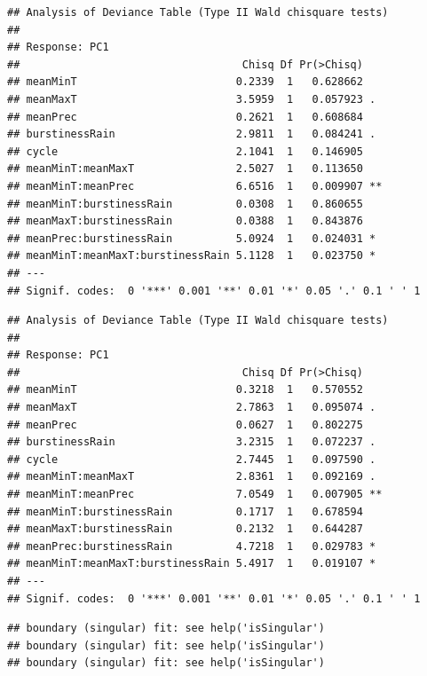 \documentclass[
]{article}
\begin{document}
\begin{verbatim}
## Analysis of Deviance Table (Type II Wald chisquare tests)
## 
## Response: PC1
##                                   Chisq Df Pr(>Chisq)   
## meanMinT                         0.2339  1   0.628662   
## meanMaxT                         3.5959  1   0.057923 . 
## meanPrec                         0.2621  1   0.608684   
## burstinessRain                   2.9811  1   0.084241 . 
## cycle                            2.1041  1   0.146905   
## meanMinT:meanMaxT                2.5027  1   0.113650   
## meanMinT:meanPrec                6.6516  1   0.009907 **
## meanMinT:burstinessRain          0.0308  1   0.860655   
## meanMaxT:burstinessRain          0.0388  1   0.843876   
## meanPrec:burstinessRain          5.0924  1   0.024031 * 
## meanMinT:meanMaxT:burstinessRain 5.1128  1   0.023750 * 
## ---
## Signif. codes:  0 '***' 0.001 '**' 0.01 '*' 0.05 '.' 0.1 ' ' 1
\end{verbatim}

\begin{verbatim}
## Analysis of Deviance Table (Type II Wald chisquare tests)
## 
## Response: PC1
##                                   Chisq Df Pr(>Chisq)   
## meanMinT                         0.3218  1   0.570552   
## meanMaxT                         2.7863  1   0.095074 . 
## meanPrec                         0.0627  1   0.802275   
## burstinessRain                   3.2315  1   0.072237 . 
## cycle                            2.7445  1   0.097590 . 
## meanMinT:meanMaxT                2.8361  1   0.092169 . 
## meanMinT:meanPrec                7.0549  1   0.007905 **
## meanMinT:burstinessRain          0.1717  1   0.678594   
## meanMaxT:burstinessRain          0.2132  1   0.644287   
## meanPrec:burstinessRain          4.7218  1   0.029783 * 
## meanMinT:meanMaxT:burstinessRain 5.4917  1   0.019107 * 
## ---
## Signif. codes:  0 '***' 0.001 '**' 0.01 '*' 0.05 '.' 0.1 ' ' 1
\end{verbatim}

\begin{verbatim}
## boundary (singular) fit: see help('isSingular')
## boundary (singular) fit: see help('isSingular')
## boundary (singular) fit: see help('isSingular')
\end{verbatim}
\end{document}
